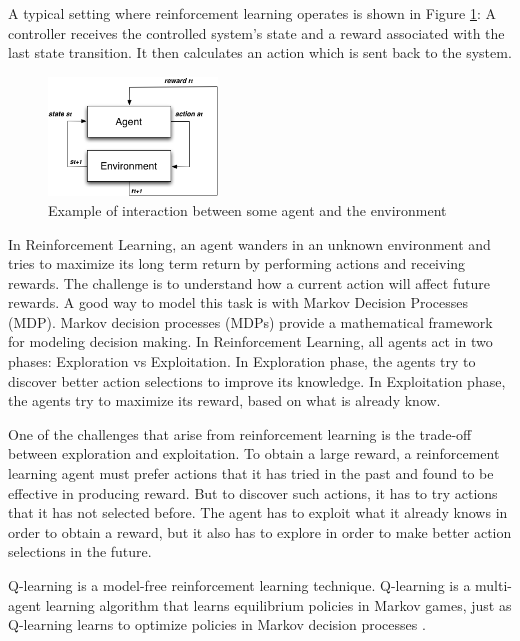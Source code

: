 \documentclass[espaco=umemeio,chapter=TITLE,twoside,openright]{abnt}
\begin{document}
A typical setting where
reinforcement learning operates is shown in Figure \ref{fig:agentenv}: A controller receives the controlled
system’s state and a reward associated with the last state transition. It then calculates an
action which is sent back to the system.


\begin{figure}
\centering
\includegraphics[width=0.4\textwidth]{./images/agentenv.png}
\caption{Example of interaction between some agent and the environment}
\label{fig:agentenv}
\end{figure}

In Reinforcement Learning, an agent wanders in an unknown environment and tries to maximize its long term return by performing actions and receiving rewards. The challenge is to understand how a current action will affect future rewards. A good way to model this task is with Markov Decision Processes (MDP). Markov decision processes (MDPs) provide a mathematical framework for modeling decision making. In Reinforcement Learning, all agents act in two phases: Exploration vs Exploitation. In Exploration phase, the agents try to discover better action selections to improve its knowledge. In Exploitation phase, the agents try to maximize its reward, based on what is already know.

One of the challenges that arise from reinforcement learning is the trade-off between exploration and exploitation. To obtain a large reward, a reinforcement learning
agent must prefer actions that it has tried in the past and found to be effective in producing reward. But to discover such actions, it has to try actions that it has not selected before. The agent has to exploit what it already knows in order to obtain a reward, but it also has to explore in order to make better action selections in the future.

Q-learning is a model-free reinforcement learning technique. Q-learning is a multi-agent learning algorithm that learns equilibrium policies in Markov games, just as Q-learning learns to optimize policies in Markov decision processes \cite{Greenwald2003}.
\end{document}
